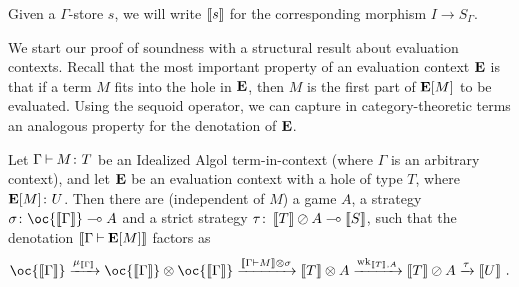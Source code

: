 Given a $\Gamma$-store $s$, we will write $\left\llbracket s\right\rrbracket$ for the corresponding morphism $I \to S_\Gamma$.

We start our proof of soundness with a structural result about evaluation contexts.
Recall that the most important property of an evaluation context ${\mathbf{E}}$ is that if a term $M$ fits into the hole in ${\mathbf{E}}$, then $M$ is the first part of ${\mathbf{E}}[M]$ to be evaluated.
Using the sequoid operator, we can capture in category-theoretic terms an analogous property for the denotation of ${\mathbf{E}}$.
\begin{lemma}
  Let $\Gamma\mathbin{\vdash} M\colon T$ be an Idealized Algol term-in-context (where $\Gamma$ is an arbitrary context), and let ${\mathbf{E}}$ be an evaluation context with a hole of type $T$, where ${\mathbf{E}}[M]\colon U$.  
  Then there are (independent of $M$) a game $A$, a strategy $\sigma\from \oc{\deno{\Gamma}} \implies A$ and a strict strategy $\tau\colon\left\llbracket T\right\rrbracket\oslash A \multimap \left\llbracket S\right\rrbracket$, such that the denotation $\left\llbracket\Gamma\mathbin{\vdash}{\mathbf{E}}[M]\right\rrbracket$ factors as
  \[
    \oc{\deno{\Gamma}} \xrightarrow{\mu_{{\deno{\Gamma}}}} \oc {\deno{\Gamma}} \tensor \oc {\deno{\Gamma}} \xrightarrow{\deno{\Gamma\ts M}\tensor\sigma} \deno{T}\tensor A \xrightarrow{\wk_{\deno{T},A}} \deno{T} \sequoid A \xrightarrow{\tau} \deno{U}\,.
    \]
  \label{LemEvContexLemma}
\end{lemma}

